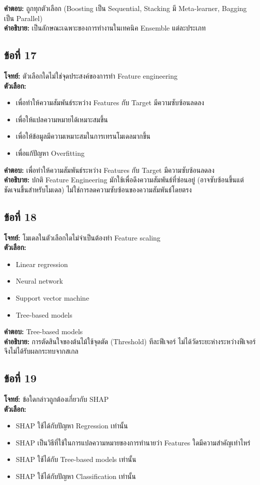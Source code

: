 \documentclass[12pt]{article}
\begin{document}
\textbf{คำตอบ:} ถูกทุกตัวเลือก (Boosting เป็น Sequential, Stacking มี Meta-learner, Bagging เป็น Parallel)\\
\textbf{คำอธิบาย:} เป็นลักษณะเฉพาะของการทำงานในเทคนิค Ensemble แต่ละประเภท

\subsection*{ข้อที่ 17}
\textbf{โจทย์:} ตัวเลือกใดไม่ใช่จุดประสงค์ของการทำ Feature engineering\\
\textbf{ตัวเลือก:}
\begin{itemize}
    \item เพื่อทำให้ความสัมพันธ์ระหว่าง Features กับ Target มีความซับซ้อนลดลง
    \item เพื่อให้แปลความหมายได้เหมาะสมขึ้น
    \item เพื่อให้ข้อมูลมีความเหมาะสมในการเทรนโมเดลมากขึ้น
    \item เพื่อแก้ปัญหา Overfitting
\end{itemize}

\textbf{คำตอบ:} เพื่อทำให้ความสัมพันธ์ระหว่าง Features กับ Target มีความซับซ้อนลดลง\\
\textbf{คำอธิบาย:} ปกติ Feature Engineering มักใช้เพื่อดึงความสัมพันธ์ที่ซ่อนอยู่ (อาจซับซ้อนขึ้นแต่ชัดเจนขึ้นสำหรับโมเดล) ไม่ใช่การลดความซับซ้อนของความสัมพันธ์โดยตรง

\subsection*{ข้อที่ 18}
\textbf{โจทย์:} โมเดลในตัวเลือกใดไม่จำเป็นต้องทำ Feature scaling\\
\textbf{ตัวเลือก:}
\begin{itemize}
    \item Linear regression
    \item Neural network
    \item Support vector machine
    \item Tree-based models
\end{itemize}

\textbf{คำตอบ:} Tree-based models\\
\textbf{คำอธิบาย:} การตัดสินใจของต้นไม้ใช้จุดตัด (Threshold) ทีละฟีเจอร์ ไม่ได้วัดระยะห่างระหว่างฟีเจอร์ จึงไม่ได้รับผลกระทบจากสเกล

\subsection*{ข้อที่ 19}
\textbf{โจทย์:} ข้อใดกล่าวถูกต้องเกี่ยวกับ SHAP\\
\textbf{ตัวเลือก:}
\begin{itemize}
    \item SHAP ใช้ได้กับปัญหา Regression เท่านั้น
    \item SHAP เป็นวิธีที่ใช้ในการแปลความหมายของการทำนายว่า Features ใดมีความสำคัญเท่าไหร่
    \item SHAP ใช้ได้กับ Tree-based models เท่านั้น
    \item SHAP ใช้ได้กับปัญหา Classification เท่านั้น
\end{itemize}
\end{document}
